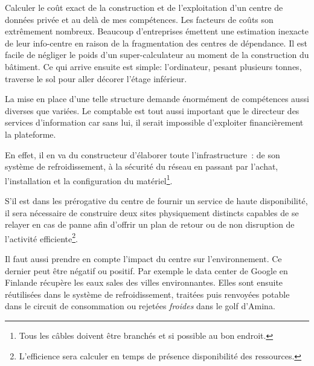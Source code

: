 \documentclass[11pt, a4paper ]{article}
\begin{document}
\begin{spacing}{1.5}




Calculer le coût exact de la construction et de l'exploitation d'un centre de données privée et au delà de mes compétences. Les facteurs de coûts son extrêmement nombreux. Beaucoup d'entreprises émettent une estimation inexacte de leur info-centre en raison de la fragmentation des centres de dépendance. Il est facile de négliger le poids d'un super-calculateur au moment de la construction du bâtiment. Ce qui arrive ensuite est simple: l'ordinateur, pesant plusieurs tonnes, traverse le sol pour aller décorer l'étage inférieur.

La mise en place d'une telle structure demande énormément de compétences aussi diverses que variées. Le comptable est tout aussi important que le directeur des services d'information car sans lui, il serait impossible d'exploiter financièrement la plateforme.

En effet, il en va du constructeur d'élaborer toute l'infrastructure : de son système de refroidissement, à la sécurité du réseau en passant par l'achat, l'installation et la configuration du matériel\footnote{Tous les câbles doivent être branchés et si possible au bon endroit.}.

S'il est dans les prérogative du centre de fournir un service de haute disponibilité, il sera nécessaire de construire deux sites physiquement distincts capables de se relayer en cas de panne afin d'offrir un plan de retour ou de non disruption de l'activité efficiente\footnote{L'efficience sera calculer en temps de présence disponibilité des ressources.}.

Il faut aussi prendre en compte l'impact du centre sur l'environnement. Ce dernier peut être négatif ou positif. Par exemple le data center de Google en Finlande récupère les eaux sales des villes environnantes. Elles sont ensuite réutilisées dans le système de refroidissement, traitées puis renvoyées potable dans le circuit de consommation ou rejetées \emph{froides} dans le golf d’Amina.


\end{spacing}
\end{document}
